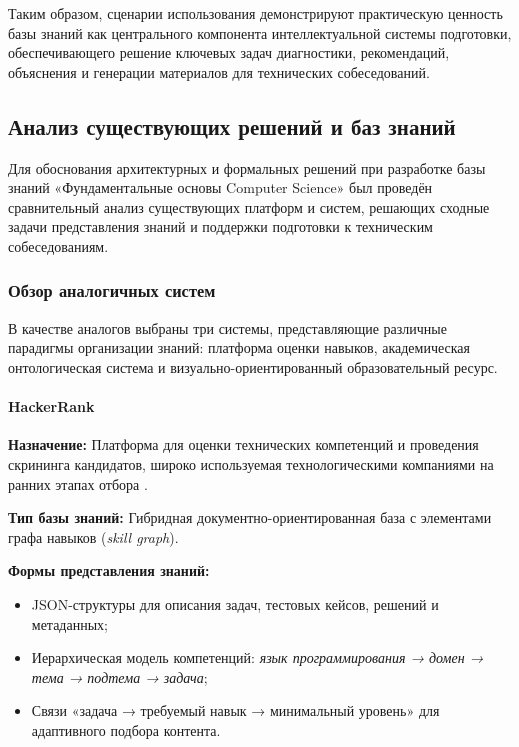 Таким образом, сценарии использования демонстрируют практическую ценность базы знаний как центрального компонента интеллектуальной системы подготовки, обеспечивающего решение ключевых задач диагностики, рекомендаций, объяснения и генерации материалов для технических собеседований.

\subsection{Анализ существующих решений и баз знаний}
\label{subsec:existing-solutions}

Для обоснования архитектурных и формальных решений при разработке базы знаний «Фундаментальные основы Computer Science» был проведён сравнительный анализ существующих платформ и систем, решающих сходные задачи представления знаний и поддержки подготовки к техническим собеседованиям.

\subsubsection*{Обзор аналогичных систем}

В качестве аналогов выбраны три системы, представляющие различные парадигмы организации знаний: платформа оценки навыков, академическая онтологическая система и визуально-ориентированный образовательный ресурс.

\paragraph{HackerRank}

\textbf{Назначение:} Платформа для оценки технических компетенций и проведения скрининга кандидатов, широко используемая технологическими компаниями на ранних этапах отбора \cite{web:hackerrank}.

\textbf{Тип базы знаний:} Гибридная документно-ориентированная база с элементами графа навыков (\textit{skill graph}).

\textbf{Формы представления знаний:}
\begin{itemize}
    \item JSON-структуры для описания задач, тестовых кейсов, решений и метаданных;
    \item Иерархическая модель компетенций: \textit{язык программирования → домен → тема → подтема → задача};
    \item Связи «задача → требуемый навык → минимальный уровень» для адаптивного подбора контента.
\end{itemize}

